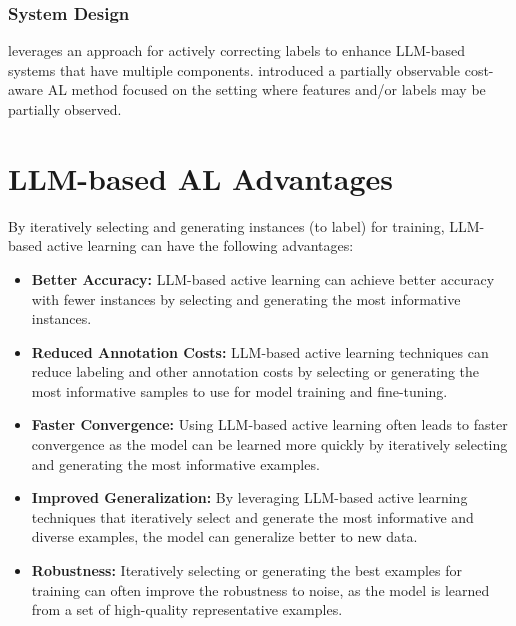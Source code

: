\subsubsection{System Design}\label{sec-apps-other-system-design}
\citet{taneja2024can} leverages an approach for actively correcting labels to enhance LLM-based systems that have multiple components.
\citet{astorga2024partially} introduced a partially observable cost-aware AL method focused on the setting where features and/or labels may be partially observed.


\section{LLM-based AL Advantages}\label{sec:appendix-AL-objectives}
By iteratively selecting and generating instances (to label) for training, LLM-based active learning can have the following advantages:

\begin{itemize}[left=0pt]
    \item \textbf{Better Accuracy:} LLM-based active learning can achieve better accuracy with fewer instances by selecting and generating the most informative instances.

    \item \textbf{Reduced Annotation Costs:} LLM-based active learning techniques can reduce labeling and other annotation costs by selecting or generating the most informative samples to use for model training and fine-tuning.

    \item \textbf{Faster Convergence:} Using LLM-based active learning often leads to faster convergence as the model can be learned more quickly by iteratively selecting and generating the most informative examples.

    \item \textbf{Improved Generalization:} By leveraging LLM-based active learning techniques that iteratively select and generate the most informative and diverse examples, the model can generalize better to new data.

    \item \textbf{Robustness:} Iteratively selecting or generating the best examples for training can often improve the robustness to noise, as the model is learned from a set of high-quality representative examples.
\end{itemize}

